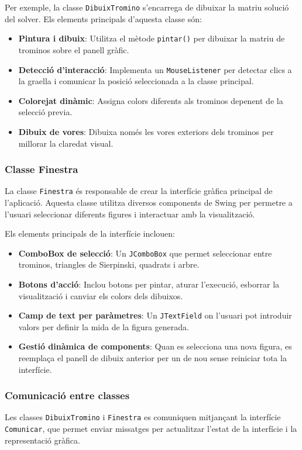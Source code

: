 \documentclass{ieeetj}
\begin{document}
Per exemple, la classe \texttt{DibuixTromino} s'encarrega de dibuixar la matriu solució del solver. Els elements principals d'aquesta classe són:
\begin{itemize}
\item \textbf{Pintura i dibuix}: Utilitza el mètode \texttt{pintar()} per dibuixar la matriu de trominos sobre el panell gràfic.
\item \textbf{Detecció d'interacció}: Implementa un \texttt{MouseListener} per detectar clics a la graella i comunicar la posició seleccionada a la classe principal.
\item \textbf{Colorejat dinàmic}: Assigna colors diferents als trominos depenent de la selecció previa.
\item \textbf{Dibuix de vores}: Dibuixa només les vores exteriors dels trominos per millorar la claredat visual.
\end{itemize}

\subsubsection{Classe Finestra}
La classe \texttt{Finestra} és responsable de crear la interfície gràfica principal de l'aplicació. Aquesta classe utilitza diversos components de Swing per permetre a l'usuari seleccionar diferents figures i interactuar amb la visualització.\newline

Els elements principals de la interfície inclouen:
\begin{itemize}
\item \textbf{ComboBox de selecció}: Un \texttt{JComboBox} que permet seleccionar entre trominos, triangles de Sierpinski, quadrats i arbre.
\item \textbf{Botons d'acció}: Inclou botons per pintar, aturar l'execució, esborrar la visualització i canviar els colors dels dibuixos.
\item \textbf{Camp de text per paràmetres}: Un \texttt{JTextField} on l'usuari pot introduir valors per definir la mida de la figura generada.
\item \textbf{Gestió dinàmica de components}: Quan es selecciona una nova figura, es reemplaça el panell de dibuix anterior per un de nou sense reiniciar tota la interfície.
\end{itemize}

\subsubsection{Comunicació entre classes}
Les classes \texttt{DibuixTromino} i \texttt{Finestra} es comuniquen mitjançant la interfície \texttt{Comunicar}, que permet enviar missatges per actualitzar l'estat de la interfície i la representació gràfica.
\end{document}
